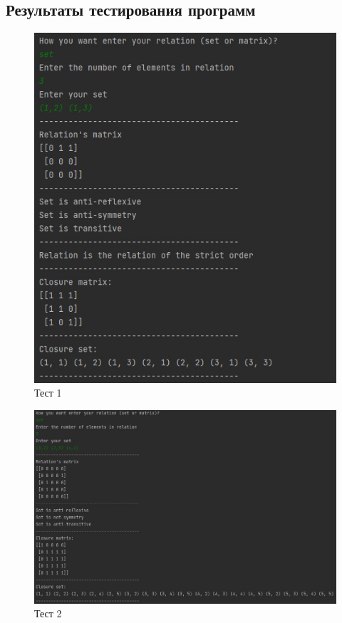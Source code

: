 \documentclass[spec, och, labwork]{shiza}
\begin{document}
            \inputminted[fontsize=\small]{python}{../code/lab1.py}
    
        \subsection{Результаты тестирования программ}

        \begin{figure}[H]
            \centering      %
            \includegraphics[width=1.\textwidth]{1}
            \caption{Тест 1}
            \label{fig:image1}
        \end{figure}
        
        \begin{figure}[H]
            \centering      %
            \includegraphics[width=1.\textwidth]{2}
            \caption{Тест 2}
            \label{fig:image1}
        \end{figure}
\end{document}
